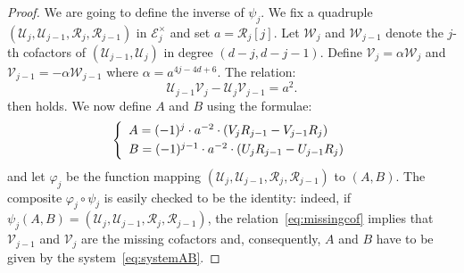 \documentclass{sig-alternate}
\begin{document}
\begin{proof} 
We are going to define the inverse of $\psi_j$. We fix a quadruple 
$(\mathcal U_j, \mathcal U_{j-1}, \mathcal R_j, \mathcal R_{j-1})$ in 
$\mathcal E_j^\times$ and set $a = \mathcal R_j[j]$.
Let $\mathcal W_j$ and $\mathcal W_{j-1}$ denote 
the $j$-th cofactors of $(\mathcal U_{j-1}, \mathcal U_j)$ in degree 
$(d{-}j, d{-}j{-}1)$. Define $\mathcal V_j = \alpha \mathcal W_j$ and 
$\mathcal V_{j-1} = -\alpha \mathcal W_{j-1}$ where $\alpha =
a^{4j-4d+6}$. The relation:
\begin{equation}
\label{eq:missingcof}
\mathcal U_{j-1} \mathcal V_j - 
\mathcal U_j \mathcal V_{j-1} = a^2.
\end{equation}
then holds. We now define $A$ and $B$ using the formulae:
\begin{equation}
\label{eq:systemAB}
\left\{\begin{array}{l}
A = (-1)^j \cdot a^{-2} \cdot (V_j R_{j-1} - V_{j-1} R_j) \smallskip \\
B = (-1)^{j-1} \cdot a^{-2} \cdot (U_j R_{j-1} - U_{j-1} R_j) \\
\end{array}\right.
\end{equation}
and let $\varphi_j$ be the function mapping $(\mathcal U_j, \mathcal 
U_{j-1}, \mathcal R_j, \mathcal R_{j-1})$ to $(A,B)$. The composite 
$\varphi_j \circ \psi_j$ is easily checked to be the identity: indeed, 
if $\psi_j(A,B) = (\mathcal U_j, \mathcal U_{j-1}, \mathcal R_j, 
\mathcal R_{j-1})$, the relation~\eqref{eq:missingcof} implies that 
$\mathcal V_{j-1}$ and $\mathcal V_j$ are the missing cofactors and, 
consequently, $A$ and $B$ have to be given by the 
system~\eqref{eq:systemAB}.


\end{proof}
\end{document}
